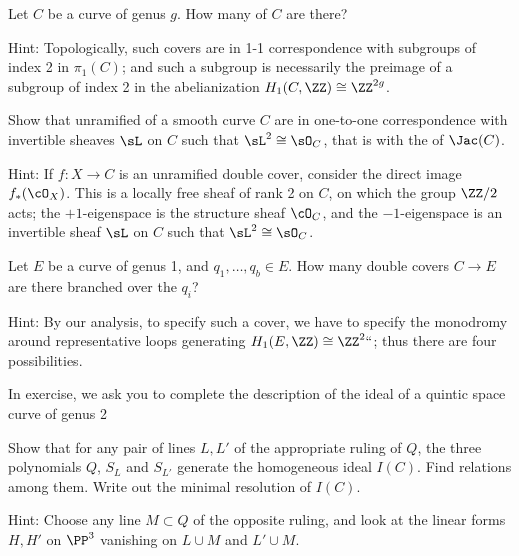 \begin{exercise}
Let $C$ be a curve of genus $g$. How many 
of $C$
%
are there?

Hint: Topologically, such covers are in 1-1 correspondence with
subgroups of index 2 in $\pi_1(C)$; and such a subgroup is necessarily
the preimage of a subgroup of index 2 in the abelianization $H_1(C, \ZZ)
\cong \ZZ^{2g}$.
\end{exercise}

\begin{exercise}
Show that unramified 
%
of a smooth curve $C$ are in one-to-one
correspondence
with invertible sheaves $\sL$ on $C$ such that $\sL^2 \cong \sO_C$,
that is with the 
%
of $\Jac(C)$.

Hint: If $f : X \to C$ is an unramified double cover, consider the direct
image $f_*(\cO_X)$. This is a locally free sheaf of rank 2 on $C$,
on which the group $\ZZ/2$ acts; the $+1$-eigenspace is the structure
sheaf $\cO_C$, and the $-1$-eigenspace is an invertible sheaf $\sL$
on $C$ such that $\sL^2 \cong \sO_C$.
\end{exercise}

\begin{exercise} Let $E$ be a curve of genus 1, and $q_1,\dots,q_b \in
E$. How many double covers $C \to E$ are there branched over the $q_i$?

Hint: By our analysis, to specify such a cover, we have to specify the
monodromy around representative loops generating $H_1(E, \ZZ) \cong
\ZZ^2` `$; thus there are four possibilities.
\end{exercise}

\begin{exercise}
\label{ideal of genus 2 degree 5}
In 
exercise, we ask you to complete the
description
of the ideal of a quintic space curve of
genus 2

Show that for any pair of lines $L, L'$ of the appropriate ruling of $Q$,
%
the three polynomials $Q$, $S_L$ and $S_{L'}$ generate the homogeneous
ideal $I(C)$. Find relations among them. Write out the minimal resolution
of $I(C)$.

Hint: Choose any line $M \subset Q$ of the opposite ruling, and look
at the linear forms $H, H'$ on $\PP^3$ vanishing on $L \cup M$ and $L'
\cup M$.
\end{exercise}

